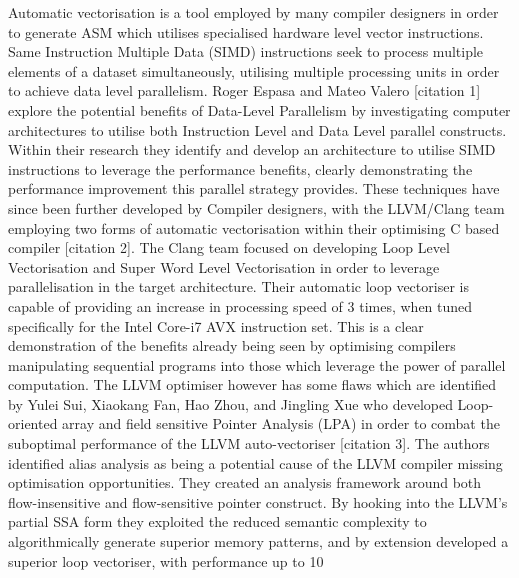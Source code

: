 Automatic vectorisation is a tool employed by many compiler designers in order to generate ASM which utilises specialised hardware level vector instructions. Same Instruction Multiple Data (SIMD) instructions seek to process multiple elements of a dataset simultaneously, utilising multiple processing units in order to achieve data level parallelism. Roger Espasa and Mateo Valero [citation 1] explore the potential benefits of Data-Level Parallelism by investigating computer architectures to utilise both Instruction Level and Data Level parallel constructs. Within their research they identify and develop an architecture to utilise SIMD instructions to leverage the performance benefits, clearly demonstrating the performance improvement this parallel strategy provides. These techniques have since been further developed by Compiler designers, with the LLVM/Clang team employing two forms of automatic vectorisation within their optimising C based compiler [citation 2]. The Clang team focused on developing Loop Level Vectorisation and Super Word Level Vectorisation in order to leverage parallelisation in the target architecture. Their automatic loop vectoriser is capable of providing an increase in processing speed of 3 times, when tuned specifically for the Intel Core-i7 AVX instruction set. This is a clear demonstration of the benefits already being seen by optimising compilers manipulating sequential programs into those which leverage the power of parallel computation. The LLVM optimiser however has some flaws which are identified by Yulei Sui, Xiaokang Fan, Hao Zhou, and Jingling Xue who developed Loop-oriented array and field sensitive Pointer Analysis (LPA) in order to combat the suboptimal performance of the LLVM auto-vectoriser [citation 3]. The authors identified alias analysis as being a potential cause of the LLVM compiler missing optimisation opportunities. They created an analysis framework around both flow-insensitive and flow-sensitive pointer construct. By hooking into the LLVM’s partial SSA form they exploited the reduced semantic complexity to algorithmically generate superior memory patterns, and by extension developed a superior loop vectoriser, with performance up to 10%
